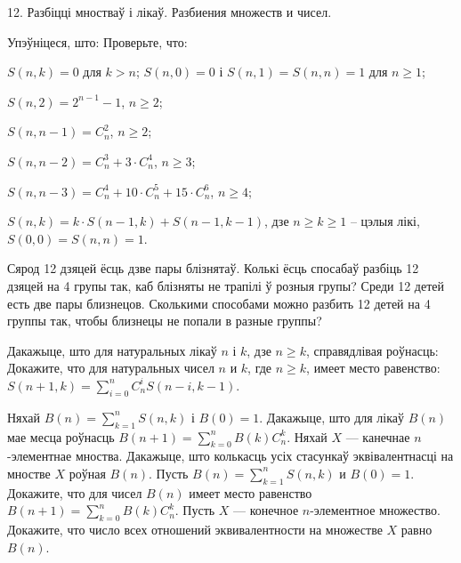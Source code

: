 



\biLangHeader
{12. Разбіцці мностваў і лікаў.}
{Разбиения множеств и чисел.}

\begin{problemList}

\problemItemWithCommonPart
{Упэўніцеся, што:}
{Проверьте, что:}
{\begin{belarusianEnumerate}
  \item $S(n, k) = 0$ для $k > n$; $S(n, 0) = 0$ і $S(n, 1) = S(n, n) = 1$ для $n \ge 1$;
  \item $S(n, 2) = 2^{n - 1} - 1$, $n \ge 2$;
  \item $S(n, n - 1) = C_n^2$, $n \ge 2$;
  \item $S(n, n - 2) = C_n^3 + 3 \cdot C_n^4$, $n \ge 3$;
  \item $S(n, n - 3) = C_n^4 + 10 \cdot C_n^5 + 15 \cdot C_n^6$, $n \ge 4$;
  \item $S(n, k) = k \cdot S(n - 1, k) + S(n - 1, k - 1)$, дзе $n \ge k \ge 1$ -- цэлыя лікі,
  $S(0, 0) = S(n, n) = 1$.
\end{belarusianEnumerate}}

\problemItemSimple
{Сярод 12 дзяцей ёсць дзве пары блізнятаў. Колькі ёсць спосабаў разбіць 12 дзяцей
на 4 групы так, каб блізняты не трапілі ў розныя групы?}
{Среди 12 детей есть две пары близнецов. Сколькими способами можно разбить
12 детей на 4 группы так, чтобы близнецы не попали в разные группы?}

\problemItemWithCommonPart
{Дакажыце, што для натуральных лікаў $n$ і $k$, дзе $n \ge k$,
справядлівая роўнасць:}
{Докажите, что для натуральных чисел $n$ и $k$, где $n \ge k$,
имеет место равенство:}
{$S(n + 1, k) = \sum\limits_{i = 0}^n C_n^i S(n - i, k - 1)$.}

\problemItemSimple
{Няхай $B(n) = \sum\limits_{k = 1}^n S(n, k)$ і $B(0) = 1$. Дакажыце,
што для лікаў $B(n)$ мае месца роўнасць $B(n + 1) = \sum\limits_{k = 0}^n B(k)C_n^k$.
Няхай $X$ --- канечнае $n$-элементнае мноства. Дакажыце, што колькасць усіх
стасункаў эквівалентнасці на мностве $X$ роўная $B(n)$.}
{Пусть $B(n) = \sum\limits_{k = 1}^n S(n, k)$ и $B(0) = 1$. Докажите,
что для чисел $B(n)$ имеет место равенство $B(n + 1) = \sum\limits_{k = 0}^n B(k)C_n^k$.
Пусть $X$ --- конечное $n$-элементное множество. Докажите, что число всех
отношений эквивалентности на множестве $X$ равно $B(n)$.}

\bigskip


\end{problemList}
